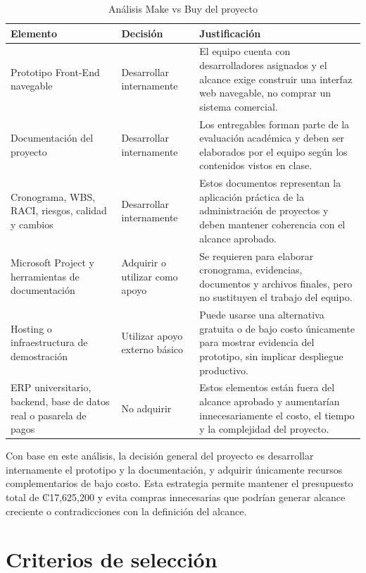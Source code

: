 \documentclass[11pt,spanish]{article}
\begin{document}
\begin{table}[H]
\centering
\caption{Análisis Make vs Buy del proyecto}
\label{tab:make-buy}
{\small
\begin{tabularx}{\textwidth}{p{4cm} p{3cm} Y}
\toprule
\textbf{Elemento} & \textbf{Decisión} & \textbf{Justificación} \\
\midrule
Prototipo Front-End navegable & Desarrollar internamente & El equipo cuenta con desarrolladores asignados y el alcance exige construir una interfaz web navegable, no comprar un sistema comercial. \\
Documentación del proyecto & Desarrollar internamente & Los entregables forman parte de la evaluación académica y deben ser elaborados por el equipo según los contenidos vistos en clase. \\
Cronograma, WBS, RACI, riesgos, calidad y cambios & Desarrollar internamente & Estos documentos representan la aplicación práctica de la administración de proyectos y deben mantener coherencia con el alcance aprobado. \\
Microsoft Project y herramientas de documentación & Adquirir o utilizar como apoyo & Se requieren para elaborar cronograma, evidencias, documentos y archivos finales, pero no sustituyen el trabajo del equipo. \\
Hosting o infraestructura de demostración & Utilizar apoyo externo básico & Puede usarse una alternativa gratuita o de bajo costo únicamente para mostrar evidencia del prototipo, sin implicar despliegue productivo. \\
ERP universitario, backend, base de datos real o pasarela de pagos & No adquirir & Estos elementos están fuera del alcance aprobado y aumentarían innecesariamente el costo, el tiempo y la complejidad del proyecto. \\
\bottomrule
\end{tabularx}
}
\end{table}

Con base en este análisis, la decisión general del proyecto es desarrollar internamente el prototipo y la documentación, y adquirir únicamente recursos complementarios de bajo costo. Esta estrategia permite mantener el presupuesto total de ₡17,625,200 y evita compras innecesarias que podrían generar alcance creciente o contradicciones con la definición del alcance.


\section{Criterios de selección}
\end{document}
